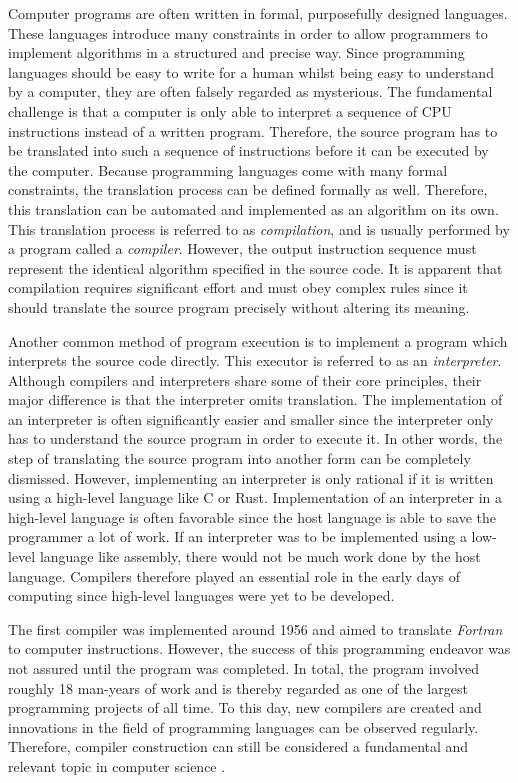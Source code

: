 Computer programs are often written in formal, purposefully designed languages.
These languages introduce many constraints in order to allow
programmers to implement algorithms in a structured and precise way.
Since programming languages should be easy to write for a human whilst being easy to understand by a computer,
they are often falsely regarded as mysterious.
The fundamental challenge is that a computer is only able to interpret a sequence of CPU instructions instead of a written program.
Therefore, the source program has to be translated into such a sequence of instructions before it can be executed by the computer.
Because programming languages come with many formal constraints, the translation process can be defined formally as well.
Therefore, this translation can be automated and implemented as an algorithm on its own.
This translation process is referred to as \emph{compilation}, and is usually performed by a program called a \emph{compiler}.
However, the output instruction sequence must represent the identical algorithm specified in the source code.
It is apparent that compilation requires significant effort and must obey complex rules
since it should translate the source program precisely without altering its meaning.

Another common method of program execution is to implement a program which interprets the source code directly.
This executor is referred to as an \emph{interpreter}.
Although compilers and interpreters share some of their core principles, their major difference is that the interpreter omits translation.
The implementation of an interpreter is often significantly easier and smaller since the interpreter only has to understand the source program in order to execute it.
In other words, the step of translating the source program into another form can be completely dismissed.
However, implementing an interpreter is only rational if it is written using a high-level language like C or Rust.
Implementation of an interpreter in a high-level language is often favorable since the host language is able to save the programmer a lot of work.
If an interpreter was to be implemented using a low-level language like assembly, there would not be much work done by the host language.
Compilers therefore played an essential role in the early days of computing since high-level languages were yet to be developed.

The first compiler was implemented around 1956 and aimed to translate \emph{Fortran} to computer instructions.
However, the success of this programming endeavor was not assured until the program was completed.
In total, the program involved roughly 18 man-years of work
and is thereby regarded as one of the largest programming projects of all time.
To this day, new compilers are created and innovations in the field of programming languages can be observed regularly.
Therefore, compiler construction can still be considered a fundamental and relevant topic in computer science
\cite[p.~6]{wirth_compiler_construction_2005}.
